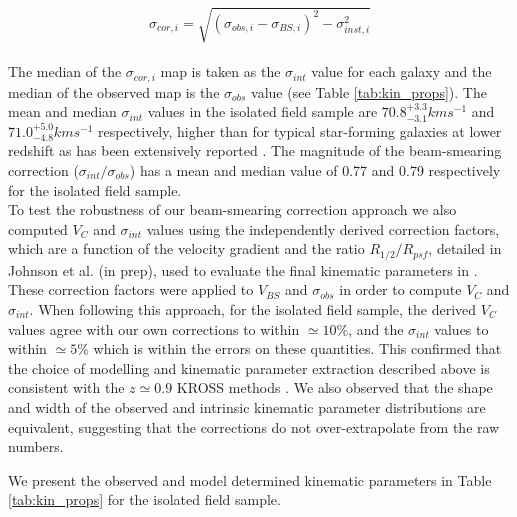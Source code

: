 \documentclass[fleqn,usenatbib]{mnras}
\begin{document}
\begin{equation}\label{eq:owen_sigma}
\sigma_{cor,i} = \sqrt{\left(\sigma_{obs,i} - \sigma_{BS,i}\right)^{2} - \sigma_{inst,i}^{2}}
\end{equation} \\

The median of the $\sigma_{cor,i}$ map is taken as the $\sigma_{int}$ value for each galaxy and the median of the observed map is the $\sigma_{obs}$ value (see Table \ref{tab:kin_props}).
The mean and median $\sigma_{int}$ values in the isolated field sample are $70.8^{+3.3}_{-3.1} kms^{-1}$ and $71.0^{+5.0}_{-4.8} kms^{-1}$ respectively, higher than for typical star-forming galaxies at lower redshift as has been extensively reported \citep[e.g.][]{Genzel2006,Genzel2008,ForsterSchreiber2009,Law2009,Gnerucci2011,Epinat2012,Wisnioski2015}.
The magnitude of the beam-smearing correction ($\sigma_{int}/\sigma_{obs}$) has a mean and median value of 0.77 and 0.79 respectively for the isolated field sample. \\

To test the robustness of our beam-smearing correction approach we also computed $V_{C}$ and $\sigma_{int}$ values using the independently derived correction factors, which are a function of the velocity gradient and the ratio $R_{1/2}/R_{psf}$, detailed in Johnson et al. (in prep), used to evaluate the final kinematic parameters in \cite{Harrison2017}.
These correction factors were applied to $V_{BS}$ and $\sigma_{obs}$ in order to compute $V_{C}$ and $\sigma_{int}$.
When following this approach, for the isolated field sample, the derived $V_{C}$ values agree with our own corrections to within $\simeq10\%$, and the $\sigma_{int}$ values to within $\simeq5\%$ which is within the errors on these quantities. 
This confirmed that the choice of modelling and kinematic parameter extraction described above is consistent with the $z\simeq0.9$ KROSS methods \citep{Harrison2017}.
We also observed that the shape and width of the observed and intrinsic kinematic parameter distributions are equivalent, suggesting that the corrections do not over-extrapolate from the raw numbers.

We present the observed and model determined kinematic parameters in Table \ref{tab:kin_props} for the isolated field sample.
\end{document}
